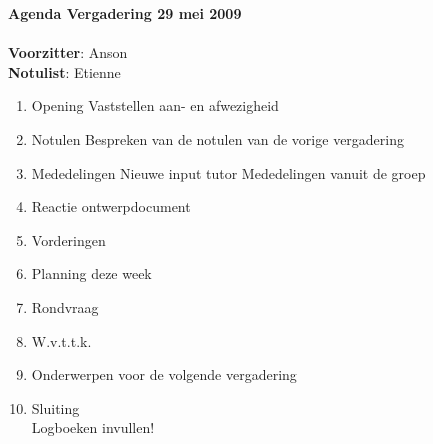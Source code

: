 \documentclass[11pt,oneside,a4paper]{article}
\begin{document}
\textbf{{\LARGE{Agenda Vergadering 29 mei 2009}}}\\ \\
\textbf{Voorzitter}: Anson\\
\textbf{Notulist}: Etienne\\

\begin{enumerate}

    \item Opening
    		\subitem Vaststellen aan- en afwezigheid
    \item Notulen
        \subitem Bespreken van de notulen van de vorige vergadering
    \item Mededelingen
			\subitem Nieuwe input tutor
			\subitem Mededelingen vanuit de groep

	 \item Reactie ontwerpdocument
	 \item Vorderingen
    \item Planning deze week

    \item Rondvraag
	 \item W.v.t.t.k.
	 \item Onderwerpen voor de volgende vergadering
    \item Sluiting\\

    Logboeken invullen!
\end{enumerate}
\end{document}
